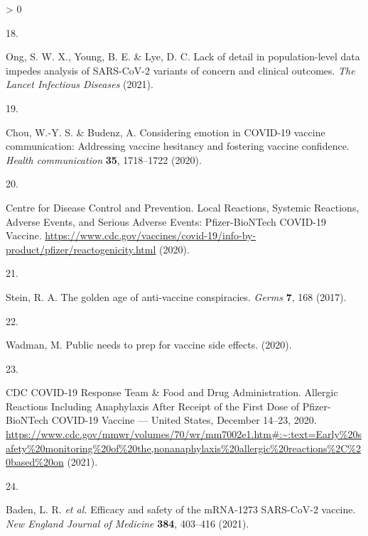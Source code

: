 \documentclass[
  12pt,
]{article}
\newlength{\cslhangindent}
\newlength{\csllabelwidth}
\newenvironment{CSLReferences}[2] %
 {%
  \setlength{\parindent}{0pt}
  \ifodd #1 \everypar{\setlength{\hangindent}{\cslhangindent}}\ignorespaces\fi
  \ifnum #2 > 0
  \setlength{\parskip}{#2\baselineskip}
  \fi
 }%
 {}
\newcommand{\CSLLeftMargin}[1]{\parbox[t]{\csllabelwidth}{#1}}
\newcommand{\CSLRightInline}[1]{\parbox[t]{\linewidth - \csllabelwidth}{#1}\break}
\providecommand{\DIFaddbegin}{} %
\providecommand{\DIFaddend}{} %
\providecommand{\DIFdelbegin}{} %
\providecommand{\DIFdelend}{} %
\newcommand{\DIFscaledelfig}{0.5}
\newlength{\DIFdelgraphicswidth} %
\newlength{\DIFdelgraphicsheight} %
\newcommand{\DIFaddincludegraphics}[2][]{{\color{blue}\fbox{\DIFOincludegraphics[#1]{#2}}}} %
\newcommand{\DIFdelincludegraphics}[2][]{%
\sbox{\DIFdelgraphicsbox}{\DIFOincludegraphics[#1]{#2}}%
\settoboxwidth{\DIFdelgraphicswidth}{\DIFdelgraphicsbox} %
\settoboxtotalheight{\DIFdelgraphicsheight}{\DIFdelgraphicsbox} %
\scalebox{\DIFscaledelfig}{%
\parbox[b]{\DIFdelgraphicswidth}{\usebox{\DIFdelgraphicsbox}\\[-\baselineskip] \rule{\DIFdelgraphicswidth}{0em}}\llap{\resizebox{\DIFdelgraphicswidth}{\DIFdelgraphicsheight}{%
\setlength{\unitlength}{\DIFdelgraphicswidth}%
\begin{picture}(1,1)%
\thicklines\linethickness{2pt} %
{\color[rgb]{1,0,0}\put(0,0){\framebox(1,1){}}}%
{\color[rgb]{1,0,0}\put(0,0){\line( 1,1){1}}}%
{\color[rgb]{1,0,0}\put(0,1){\line(1,-1){1}}}%
\end{picture}%
}\hspace*{3pt}}} %
} %
\DeclareRobustCommand{\DIFaddbegin}{\DIFOaddbegin \let\includegraphics\DIFaddincludegraphics} %
\DeclareRobustCommand{\DIFaddend}{\DIFOaddend \let\includegraphics\DIFOincludegraphics} %
\DeclareRobustCommand{\DIFdelbegin}{\DIFOdelbegin \let\includegraphics\DIFdelincludegraphics} %
\DeclareRobustCommand{\DIFdelend}{\DIFOaddend \let\includegraphics\DIFOincludegraphics} %
\begin{document}
\begin{CSLReferences}{0}{0}
\leavevmode\DIFaddbegin \hypertarget{ref-ong2021lack}{}%
\CSLLeftMargin{18. }
\CSLRightInline{Ong, S. W. X., Young, B. E. \& Lye, D. C. Lack of detail in population-level data impedes analysis of SARS-CoV-2 variants of concern and clinical outcomes. \emph{The Lancet Infectious Diseases} (2021).}

\leavevmode\DIFaddend \hypertarget{ref-chou2020considering}{}%
\DIFdelbegin %
\DIFdelend \DIFaddbegin \CSLLeftMargin{19. }
\DIFaddend \CSLRightInline{Chou, W.-Y. S. \& Budenz, A. Considering emotion in COVID-19 vaccine communication: Addressing vaccine hesitancy and fostering vaccine confidence. \emph{Health communication} \textbf{35}, 1718--1722 (2020).}

\leavevmode\hypertarget{ref-cdcadverse}{}%
\DIFdelbegin %
\DIFdelend \DIFaddbegin \CSLLeftMargin{20. }
\DIFaddend \CSLRightInline{Centre for Disease Control and Prevention. {Local Reactions, Systemic Reactions, Adverse Events, and Serious Adverse Events: Pfizer-BioNTech COVID-19 Vaccine}. \url{https://www.cdc.gov/vaccines/covid-19/info-by-product/pfizer/reactogenicity.html} (2020).}

\leavevmode\hypertarget{ref-stein2017golden}{}%
\DIFdelbegin %
\DIFdelend \DIFaddbegin \CSLLeftMargin{21. }
\DIFaddend \CSLRightInline{Stein, R. A. The golden age of anti-vaccine conspiracies. \emph{Germs} \textbf{7}, 168 (2017).}

\leavevmode\hypertarget{ref-wadman2020public}{}%
\DIFdelbegin %
\DIFdelend \DIFaddbegin \CSLLeftMargin{22. }
\DIFaddend \CSLRightInline{Wadman, M. Public needs to prep for vaccine side effects. (2020).}

\leavevmode\hypertarget{ref-cdcallergies}{}%
\DIFdelbegin %
\DIFdelend \DIFaddbegin \CSLLeftMargin{23. }
\DIFaddend \CSLRightInline{CDC COVID-19 Response Team \& Food and Drug Administration. {Allergic Reactions Including Anaphylaxis After Receipt of the First Dose of Pfizer-BioNTech COVID-19 Vaccine --- United States, December 14--23, 2020}. \url{https://www.cdc.gov/mmwr/volumes/70/wr/mm7002e1.htm\#:~:text=Early\%20safety\%20monitoring\%20of\%20the,nonanaphylaxis\%20allergic\%20reactions\%2C\%20based\%20on} (2021).}

\leavevmode\hypertarget{ref-baden2021efficacy}{}%
\DIFdelbegin %
\DIFdelend \DIFaddbegin \CSLLeftMargin{24. }
\DIFaddend \CSLRightInline{Baden, L. R. \emph{et al.} Efficacy and safety of the mRNA-1273 SARS-CoV-2 vaccine. \emph{New England Journal of Medicine} \textbf{384}, 403--416 (2021).}


\end{CSLReferences}
\end{document}
